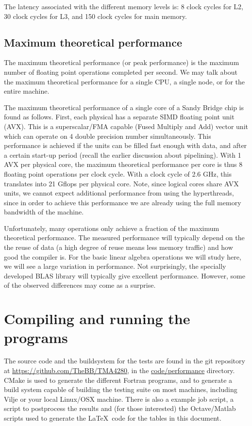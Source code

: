 The latency associated with the different memory levels is: 8 clock cycles for
L2, 30 clock cycles for L3, and 150 clock cycles for main memory.

\subsection{Maximum theoretical performance}

The maximum theoretical performance (or peak performance) is the maximum number
of floating point operations completed per second. We may talk about the maximum
theoretical performance for a single CPU, a single node, or for the entire
machine.

The maximum theoretical performance of a single core of a Sandy Bridge chip is
found as follows. First, each physical has a separate SIMD floating point unit
(AVX). This is a superscalar/FMA capable (Fused Multiply and Add) vector unit
which can operate on 4 double precision number simultaneously. This performance
is achieved if the units can be filled fast enough with data, and after a
certain start-up period (recall the earlier discussion about pipelining). With 1
AVX per physical core, the maximum theoretical performance per core is thus 8
floating point operations per clock cycle. With a clock cycle of 2.6 GHz, this
translates into 21 Gflops per physical core. Note, since logical cores share AVX
units, we cannot expect additional performance from using the hyperthreads,
since in order to achieve this performance we are already using the full memory
bandwidth of the machine.

Unfortunately, many operations only achieve a fraction of the maximum
theoretical performance. The measured performance will typically depend on the
the reuse of data (a high degree of reuse means less memory traffic) and how
good the compiler is. For the basic linear algebra operations we will study
here, we will see a large variation in performance. Not surprisingly, the
specially developed BLAS library will typically give excellent performance.
However, some of the observed differences may come as a surprise.

\section{Compiling and running the programs}

The source code and the buildsystem for the tests are found in the git
repository at \url{https://github.com/TheBB/TMA4280}, in the
\url{code/performance} directory. CMake is used to generate the different
Fortran programs, and to generate a build system capable of building the testing
suite on most machines, including Vilje or your local Linux/OSX machine. There
is also a example job script, a script to postprocess the results and (for those
interested) the Octave/Matlab scripts used to generate the \LaTeX~code for the
tables in this document.

